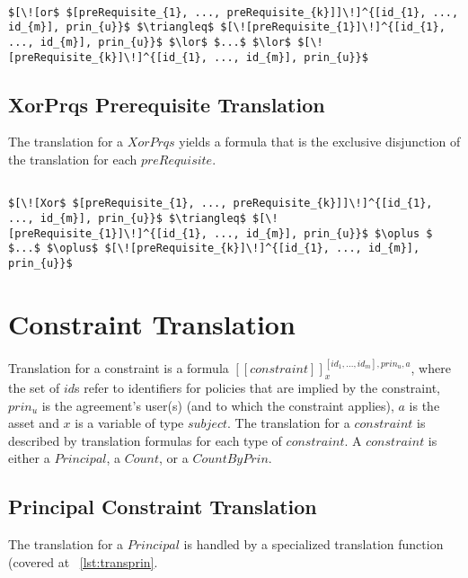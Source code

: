 \lstset{mathescape, language=AST}  
\begin{lstlisting}[frame=single, caption={Prerequisite Translation {$\colon$} Inclusive Disjunction},label={lst:transpreRequisiteOrPrqs}]

$[\![or$ $[preRequisite_{1}, ..., preRequisite_{k}]]\!]^{[id_{1}, ..., id_{m}], prin_{u}}$ $\triangleq$ $[\![preRequisite_{1}]\!]^{[id_{1}, ..., id_{m}], prin_{u}}$ $\lor$ $...$ $\lor$ $[\![preRequisite_{k}]\!]^{[id_{1}, ..., id_{m}], prin_{u}}$

\end{lstlisting}

\subsection{XorPrqs Prerequisite Translation}
The translation for a $XorPrqs$ yields a formula that is the exclusive disjunction of the translation for each $preRequisite$.


\lstset{mathescape, language=AST}  
\begin{lstlisting}[frame=single, caption={Prerequisite Translation {$\colon$} Exclusive Disjunction},label={lst:transpreRequisiteXorPrqs}]

$[\![Xor$ $[preRequisite_{1}, ..., preRequisite_{k}]]\!]^{[id_{1}, ..., id_{m}], prin_{u}}$ $\triangleq$ $[\![preRequisite_{1}]\!]^{[id_{1}, ..., id_{m}], prin_{u}}$ $\oplus $ $...$ $\oplus$ $[\![preRequisite_{k}]\!]^{[id_{1}, ..., id_{m}], prin_{u}}$

\end{lstlisting}


\section{Constraint Translation}

Translation for a constraint is a formula $[\![constraint]\!]^{[id_{1}, ..., id_{m}], prin_{u}, a}_{x}$, where the set of $id$s refer to identifiers for policies that are implied by the constraint, $prin_{u}$ is the agreement's user(s) (and to which the constraint applies), $a$ is the asset and $x$ is a variable of type $subject$. The translation for a $constraint$ is described by translation formulas for each type of $constraint$. A $constraint$ is either a $Principal$, a $Count$, or a $CountByPrin$.

\subsection{Principal Constraint Translation}
The translation for a $Principal$ is handled by a specialized translation function (covered at ~\ref{lst:transprin}.   

